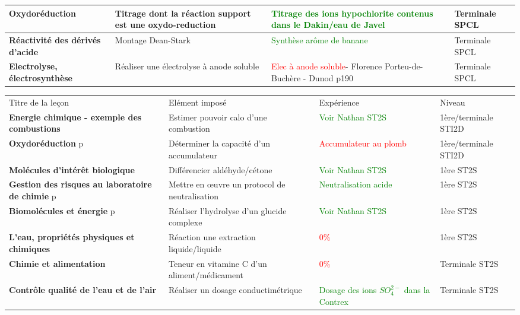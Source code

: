 \begin{changemargin}{-1.5cm}{0cm}
\begin{tabularx}{\paperwidth-2cm}{| X | X | X | X |}
  \hline
  \textbf{Oxydoréduction} & Titrage dont la réaction support est une oxydo-reduction & \textcolor{green}{Titrage des ions hypochlorite contenus dans le Dakin/eau de Javel}  & Terminale SPCL \\
  \hline
  \textbf{Réactivité des dérivés d'acide} & Montage Dean-Stark & \textcolor{green}{Synthèse arôme de banane}  & Terminale SPCL \\
  \hline
  \textbf{Electrolyse, électrosynthèse} & Réaliser une électrolyse à anode soluble & \textcolor{red}{Elec à anode soluble}- Florence Porteu-de-Buchère - Dunod p190 & Terminale SPCL \\
  \hline
\end{tabularx}
\end{changemargin}

\newpage

\begin{changemargin}{-1.5cm}{-0cm}
\begin{tabularx}{\paperwidth-2cm}{| X | X | X | X |}
  \hline
  \rowcolor{gray!20}\multicolumn{4}{c}{Avancement préparation oraux Leçons Chimie} \\
  \hline 
  Titre de la leçon & Elément imposé & Expérience & Niveau \\
  \hline
  \textbf{Energie chimique - exemple des combustions} & Estimer pouvoir calo d'une combustion & \textcolor{green}{Voir Nathan ST2S}  & 1ère/terminale STI2D \\
  \hline
  \textbf{Oxydoréduction} p\pageref{LC_Oxydoreduction_STI2D} & Déterminer la capacité d'un accumulateur & \textcolor{red}{Accumulateur au plomb}  & 1ère/terminale STI2D \\
   \hline  
  \hline
  \textbf{Molécules d'intérêt biologique} & Différencier aldéhyde/cétone & \textcolor{green}{Voir Nathan ST2S} & 1ère ST2S \\
  \hline
  \textbf{Gestion des risques au laboratoire de chimie} p\pageref{LC_GestionRisquesLabo} & Mettre en \oe uvre un protocol de neutralisation & \textcolor{green}{Neutralisation acide} & 1ère ST2S \\
  \hline
   \textbf{Biomolécules et énergie} p\pageref{LC_BiomoleculesEnergie} & Réaliser l'hydrolyse d'un glucide complexe & \textcolor{green}{Voir Nathan ST2S}  & 1ère ST2S \\
  \hline 
  \textbf{L'eau, propriétés physiques et chimiques} & Réaction une extraction liquide/liquide & \textcolor{red}{0\%} & 1ère ST2S \\
  \hline 
  \hline
  \textbf{Chimie et alimentation} & Teneur en vitamine C d'un aliment/médicament & \textcolor{red}{0\%} & Terminale ST2S \\
  \hline
  \textbf{Contrôle qualité de l'eau et de l'air} & Réaliser un dosage conductimétrique & \textcolor{green}{Dosage des ions $SO_4^{2-}$ dans la Contrex} & Terminale ST2S \\
  \hline
  \end{tabularx}
\end{changemargin}

